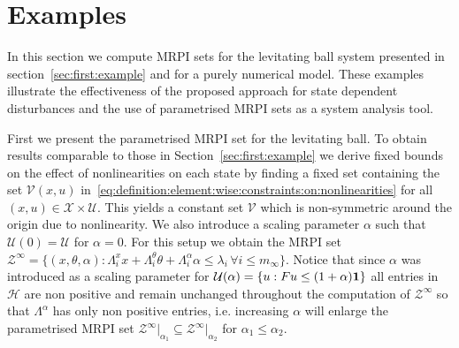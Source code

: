 \documentclass[letterpaper, 10pt, conference]{ieeeconf} %
\begin{document}
\section{Examples}\label{sec:second:example}
%
%
In this section we compute MRPI sets for the levitating ball system presented in 
section~\ref{sec:first:example} and for a purely numerical model. These examples illustrate the effectiveness 
of the proposed approach for state dependent disturbances and the use of parametrised MRPI sets as a system analysis tool. 

First we present the parametrised MRPI
set for the levitating ball. To obtain results comparable to those in Section~\ref{sec:first:example} we derive fixed bounds
on the effect of nonlinearities on each state by finding a fixed set containing the set $\mathcal V(x,u)$ 
in~\eqref{eq:definition:element:wise:constraints:on:nonlinearities} for all $(x,u)\in\mathcal X\times\mathcal U$. 
This yields a constant set $\mathcal V$ which is non-symmetric around the origin due to nonlinearity. We also introduce
a scaling parameter $\alpha$ such that $\mathcal U(0)=\mathcal U$ for $\alpha=0$. For this setup we obtain the MRPI
set $\mathcal Z^\infty=\{(x,\theta,\alpha): \Lambda_i^x x + \Lambda_i^\theta \theta + \Lambda_i^\alpha \alpha\leq
\lambda_i\,\forall i\leq m_\infty\}$. Notice that since $\alpha$ was introduced as a scaling parameter
for $\mathcal U(\alpha)=\{u: Fu\leq (1+\alpha){\bf{1}}\}$ all entries in $\mathcal H$ are non positive and
remain unchanged throughout the computation of $\mathcal Z^\infty$ so that $\Lambda^\alpha$ has only non
positive entries, i.e. increasing $\alpha$ will enlarge the parametrised MRPI set $\mathcal Z^\infty\vert_{\alpha_1}
\subseteq\mathcal Z^\infty\vert_{\alpha_2}$ for $\alpha_1\leq\alpha_2$.
\end{document}
